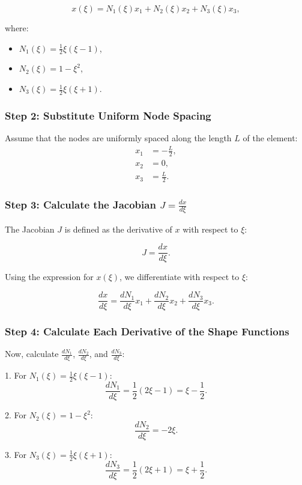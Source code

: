 \[
x(\xi) = N_1(\xi) x_1 + N_2(\xi) x_2 + N_3(\xi) x_3,
\]

where:
\begin{itemize}
    \item \( N_1(\xi) = \frac{1}{2} \xi (\xi - 1) \),
    \item \( N_2(\xi) = 1 - \xi^2 \),
    \item \( N_3(\xi) = \frac{1}{2} \xi (\xi + 1) \).
\end{itemize}

\subsubsection*{Step 2: Substitute Uniform Node Spacing}
Assume that the nodes are uniformly spaced along the length \( L \) of the element:
\begin{align*}
    x_1 &= -\frac{L}{2}, \\
    x_2 &= 0, \\
    x_3 &= \frac{L}{2}.
\end{align*}

\subsubsection*{Step 3: Calculate the Jacobian \( J = \frac{dx}{d\xi} \)}
The Jacobian \( J \) is defined as the derivative of \( x \) with respect to \( \xi \):

\[
J = \frac{dx}{d\xi}.
\]

Using the expression for \( x(\xi) \), we differentiate with respect to \( \xi \):

\[
\frac{dx}{d\xi} = \frac{dN_1}{d\xi} x_1 + \frac{dN_2}{d\xi} x_2 + \frac{dN_3}{d\xi} x_3.
\]

\subsubsection*{Step 4: Calculate Each Derivative of the Shape Functions}
Now, calculate \( \frac{dN_1}{d\xi} \), \( \frac{dN_2}{d\xi} \), and \( \frac{dN_3}{d\xi} \):

1. For \( N_1(\xi) = \frac{1}{2} \xi (\xi - 1) \):
   \[
   \frac{dN_1}{d\xi} = \frac{1}{2} (2\xi - 1) = \xi - \frac{1}{2}.
   \]

2. For \( N_2(\xi) = 1 - \xi^2 \):
   \[
   \frac{dN_2}{d\xi} = -2\xi.
   \]

3. For \( N_3(\xi) = \frac{1}{2} \xi (\xi + 1) \):
   \[
   \frac{dN_3}{d\xi} = \frac{1}{2} (2\xi + 1) = \xi + \frac{1}{2}.
   \]

